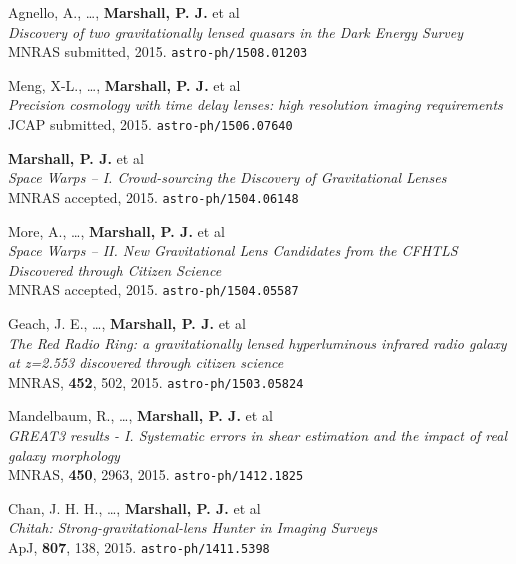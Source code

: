 \begin{revnumerate}

\item{Agnello, A., \dots, \textbf{Marshall, P. J.} et al\\
\textit{Discovery of two gravitationally lensed quasars in the Dark Energy Survey}\\
MNRAS submitted, 2015.
\texttt{astro-ph/1508.01203}
}

\item{Meng, X-L., \ldots, \textbf{Marshall, P. J.} et al\\
\textit{Precision cosmology with time delay lenses: high resolution imaging requirements}\\
JCAP submitted, 2015.
\texttt{astro-ph/1506.07640}
}

\item{\textbf{Marshall, P. J.} et al\\
\textit{Space Warps -- I. Crowd-sourcing the Discovery of Gravitational Lenses}\\
MNRAS accepted, 2015.
\texttt{astro-ph/1504.06148}
}

\item{More, A., \ldots, \textbf{Marshall, P. J.} et al\\
\textit{Space Warps -- II. New Gravitational Lens Candidates from the CFHTLS Discovered through Citizen Science}\\
MNRAS accepted, 2015.
\texttt{astro-ph/1504.05587}
}

\item{Geach, J. E., \ldots, \textbf{Marshall, P. J.} et al\\
\textit{The Red Radio Ring: a gravitationally lensed hyperluminous infrared radio galaxy at z=2.553 discovered through citizen science}\\
MNRAS, \textbf{452}, 502, 2015.
\texttt{astro-ph/1503.05824}
}

\item{Mandelbaum, R., \ldots, \textbf{Marshall, P. J.} et al\\
\textit{GREAT3 results - I. Systematic errors in shear estimation and the impact of real galaxy morphology}\\
MNRAS, \textbf{450}, 2963, 2015.
\texttt{astro-ph/1412.1825}
}

\item{Chan, J. H. H., \ldots, \textbf{Marshall, P. J.} et al\\
\textit{Chitah: Strong-gravitational-lens Hunter in Imaging Surveys}\\
ApJ, \textbf{807}, 138, 2015.
\texttt{astro-ph/1411.5398}
}


\end{revnumerate}
